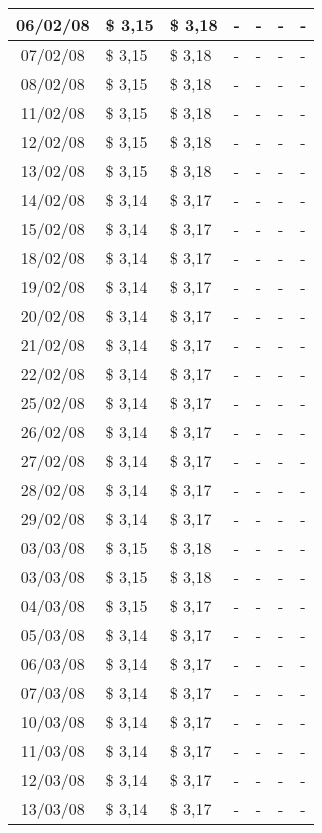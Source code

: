 \begin{center}
\begin{longtable}{|c|p{1.5cm}|p{1.5cm}|p{1.5cm}|p{1.5cm}|p{1.5cm}|p{1.5cm}|}
06/02/08 & \$ 3,15 & \$ 3,18 & - & - & - & - \\ \hline
07/02/08 & \$ 3,15 & \$ 3,18 & - & - & - & - \\ \hline
08/02/08 & \$ 3,15 & \$ 3,18 & - & - & - & - \\ \hline
11/02/08 & \$ 3,15 & \$ 3,18 & - & - & - & - \\ \hline
12/02/08 & \$ 3,15 & \$ 3,18 & - & - & - & - \\ \hline
13/02/08 & \$ 3,15 & \$ 3,18 & - & - & - & - \\ \hline
14/02/08 & \$ 3,14 & \$ 3,17 & - & - & - & - \\ \hline
15/02/08 & \$ 3,14 & \$ 3,17 & - & - & - & - \\ \hline
18/02/08 & \$ 3,14 & \$ 3,17 & - & - & - & - \\ \hline
19/02/08 & \$ 3,14 & \$ 3,17 & - & - & - & - \\ \hline
20/02/08 & \$ 3,14 & \$ 3,17 & - & - & - & - \\ \hline
21/02/08 & \$ 3,14 & \$ 3,17 & - & - & - & - \\ \hline
22/02/08 & \$ 3,14 & \$ 3,17 & - & - & - & - \\ \hline
25/02/08 & \$ 3,14 & \$ 3,17 & - & - & - & - \\ \hline
26/02/08 & \$ 3,14 & \$ 3,17 & - & - & - & - \\ \hline
27/02/08 & \$ 3,14 & \$ 3,17 & - & - & - & - \\ \hline
28/02/08 & \$ 3,14 & \$ 3,17 & - & - & - & - \\ \hline
29/02/08 & \$ 3,14 & \$ 3,17 & - & - & - & - \\ \hline
03/03/08 & \$ 3,15 & \$ 3,18 & - & - & - & - \\ \hline
03/03/08 & \$ 3,15 & \$ 3,18 & - & - & - & - \\ \hline
04/03/08 & \$ 3,15 & \$ 3,17 & - & - & - & - \\ \hline
05/03/08 & \$ 3,14 & \$ 3,17 & - & - & - & - \\ \hline
06/03/08 & \$ 3,14 & \$ 3,17 & - & - & - & - \\ \hline
07/03/08 & \$ 3,14 & \$ 3,17 & - & - & - & - \\ \hline
10/03/08 & \$ 3,14 & \$ 3,17 & - & - & - & - \\ \hline
11/03/08 & \$ 3,14 & \$ 3,17 & - & - & - & - \\ \hline
12/03/08 & \$ 3,14 & \$ 3,17 & - & - & - & - \\ \hline
13/03/08 & \$ 3,14 & \$ 3,17 & - & - & - & - \\ \hline

\end{longtable}
\end{center}
